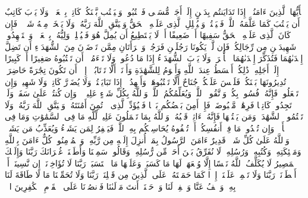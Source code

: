 \stopbuffer
\startbuffer[\q:2:282]
یَٰۤأَیُّهَا ٱلَّذِینَ ءَامَنُوۤا۟ إِذَا تَدَایَنتُم بِدَیۡنٍ إِلَىٰۤ أَجَلࣲ مُّسَمࣰّى فَٱكۡتُبُوهُۚ وَلۡیَكۡتُب بَّیۡنَكُمۡ كَاتِبُۢ بِٱلۡعَدۡلِۚ وَلَا یَأۡبَ كَاتِبٌ أَن یَكۡتُبَ كَمَا عَلَّمَهُ ٱللَّهُۚ فَلۡیَكۡتُبۡ وَلۡیُمۡلِلِ ٱلَّذِی عَلَیۡهِ ٱلۡحَقُّ وَلۡیَتَّقِ ٱللَّهَ رَبَّهُۥ وَلَا یَبۡخَسۡ مِنۡهُ شَیۡءࣰاۚ فَإِن كَانَ ٱلَّذِی عَلَیۡهِ ٱلۡحَقُّ سَفِیهًا أَوۡ ضَعِیفًا أَوۡ لَا یَسۡتَطِیعُ أَن یُمِلَّ هُوَ فَلۡیُمۡلِلۡ وَلِیُّهُۥ بِٱلۡعَدۡلِۚ وَٱسۡتَشۡهِدُوا۟ شَهِیدَیۡنِ مِن رِّجَالِكُمۡۖ فَإِن لَّمۡ یَكُونَا رَجُلَیۡنِ فَرَجُلࣱ وَٱمۡرَأَتَانِ مِمَّن تَرۡضَوۡنَ مِنَ ٱلشُّهَدَاۤءِ أَن تَضِلَّ إِحۡدَىٰهُمَا فَتُذَكِّرَ إِحۡدَىٰهُمَا ٱلۡأُخۡرَىٰۚ وَلَا یَأۡبَ ٱلشُّهَدَاۤءُ إِذَا مَا دُعُوا۟ۚ وَلَا تَسۡءَمُوۤا۟ أَن تَكۡتُبُوهُ صَغِیرًا أَوۡ كَبِیرًا إِلَىٰۤ أَجَلِهِۦۚ ذَٰلِكُمۡ أَقۡسَطُ عِندَ ٱللَّهِ وَأَقۡوَمُ لِلشَّهَٰدَةِ وَأَدۡنَىٰۤ أَلَّا تَرۡتَابُوۤا۟ إِلَّاۤ أَن تَكُونَ تِجَٰرَةً حَاضِرَةࣰ تُدِیرُونَهَا بَیۡنَكُمۡ فَلَیۡسَ عَلَیۡكُمۡ جُنَاحٌ أَلَّا تَكۡتُبُوهَاۗ وَأَشۡهِدُوۤا۟ إِذَا تَبَایَعۡتُمۡۚ وَلَا یُضَاۤرَّ كَاتِبࣱ وَلَا شَهِیدࣱۚ وَإِن تَفۡعَلُوا۟ فَإِنَّهُۥ فُسُوقُۢ بِكُمۡۗ وَٱتَّقُوا۟ ٱللَّهَۖ وَیُعَلِّمُكُمُ ٱللَّهُۗ وَٱللَّهُ بِكُلِّ شَیۡءٍ عَلِیمࣱ%
\stopbuffer
\startbuffer[\q:2:283]
۞ وَإِن كُنتُمۡ عَلَىٰ سَفَرࣲ وَلَمۡ تَجِدُوا۟ كَاتِبࣰا فَرِهَٰنࣱ مَّقۡبُوضَةࣱۖ فَإِنۡ أَمِنَ بَعۡضُكُم بَعۡضࣰا فَلۡیُؤَدِّ ٱلَّذِی ٱؤۡتُمِنَ أَمَٰنَتَهُۥ وَلۡیَتَّقِ ٱللَّهَ رَبَّهُۥۗ وَلَا تَكۡتُمُوا۟ ٱلشَّهَٰدَةَۚ وَمَن یَكۡتُمۡهَا فَإِنَّهُۥۤ ءَاثِمࣱ قَلۡبُهُۥۗ وَٱللَّهُ بِمَا تَعۡمَلُونَ عَلِیمࣱ%
\stopbuffer
\startbuffer[\q:2:284]
لِّلَّهِ مَا فِی ٱلسَّمَٰوَٰتِ وَمَا فِی ٱلۡأَرۡضِۗ وَإِن تُبۡدُوا۟ مَا فِیۤ أَنفُسِكُمۡ أَوۡ تُخۡفُوهُ یُحَاسِبۡكُم بِهِ ٱللَّهُۖ فَیَغۡفِرُ لِمَن یَشَاۤءُ وَیُعَذِّبُ مَن یَشَاۤءُۗ وَٱللَّهُ عَلَىٰ كُلِّ شَیۡءࣲ قَدِیرٌ%
\stopbuffer
\startbuffer[\q:2:285]
ءَامَنَ ٱلرَّسُولُ بِمَاۤ أُنزِلَ إِلَیۡهِ مِن رَّبِّهِۦ وَٱلۡمُؤۡمِنُونَۚ كُلٌّ ءَامَنَ بِٱللَّهِ وَمَلَٰۤئِكَتِهِۦ وَكُتُبِهِۦ وَرُسُلِهِۦ لَا نُفَرِّقُ بَیۡنَ أَحَدࣲ مِّن رُّسُلِهِۦۚ وَقَالُوا۟ سَمِعۡنَا وَأَطَعۡنَاۖ غُفۡرَانَكَ رَبَّنَا وَإِلَیۡكَ ٱلۡمَصِیرُ%
\stopbuffer
\startbuffer[\q:2:286]
لَا یُكَلِّفُ ٱللَّهُ نَفۡسًا إِلَّا وُسۡعَهَاۚ لَهَا مَا كَسَبَتۡ وَعَلَیۡهَا مَا ٱكۡتَسَبَتۡۗ رَبَّنَا لَا تُؤَاخِذۡنَاۤ إِن نَّسِینَاۤ أَوۡ أَخۡطَأۡنَاۚ رَبَّنَا وَلَا تَحۡمِلۡ عَلَیۡنَاۤ إِصۡرࣰا كَمَا حَمَلۡتَهُۥ عَلَى ٱلَّذِینَ مِن قَبۡلِنَاۚ رَبَّنَا وَلَا تُحَمِّلۡنَا مَا لَا طَاقَةَ لَنَا بِهِۦۖ وَٱعۡفُ عَنَّا وَٱغۡفِرۡ لَنَا وَٱرۡحَمۡنَاۤۚ أَنتَ مَوۡلَىٰنَا فَٱنصُرۡنَا عَلَى ٱلۡقَوۡمِ ٱلۡكَٰفِرِینَ%
\stopbuffer
\startbuffer[\q:3:1]
الۤمۤ%
